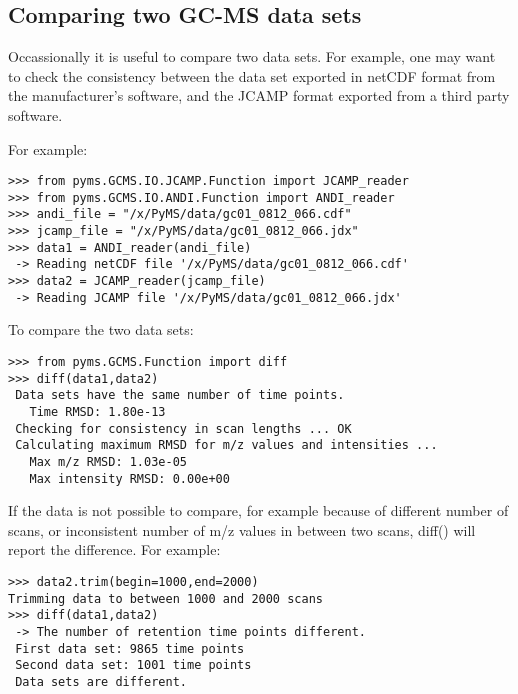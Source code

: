 \subsection{Comparing two GC-MS data sets}


Occassionally it is useful to compare two data sets. For example,
one may want to check the consistency between the data set
exported in netCDF format from the manufacturer's software, and
the JCAMP format exported from a third party software.

For example:

\begin{verbatim}
>>> from pyms.GCMS.IO.JCAMP.Function import JCAMP_reader
>>> from pyms.GCMS.IO.ANDI.Function import ANDI_reader
>>> andi_file = "/x/PyMS/data/gc01_0812_066.cdf"
>>> jcamp_file = "/x/PyMS/data/gc01_0812_066.jdx"
>>> data1 = ANDI_reader(andi_file)
 -> Reading netCDF file '/x/PyMS/data/gc01_0812_066.cdf'
>>> data2 = JCAMP_reader(jcamp_file)
 -> Reading JCAMP file '/x/PyMS/data/gc01_0812_066.jdx'
\end{verbatim}

To compare the two data sets:

\begin{verbatim}
>>> from pyms.GCMS.Function import diff
>>> diff(data1,data2)
 Data sets have the same number of time points.
   Time RMSD: 1.80e-13
 Checking for consistency in scan lengths ... OK
 Calculating maximum RMSD for m/z values and intensities ... 
   Max m/z RMSD: 1.03e-05
   Max intensity RMSD: 0.00e+00
\end{verbatim}

If the data is not possible to compare, for example because of
different number of scans, or inconsistent number of m/z values
in between two scans, diff() will report the difference.
For example:

\begin{verbatim}
>>> data2.trim(begin=1000,end=2000)
Trimming data to between 1000 and 2000 scans
>>> diff(data1,data2)
 -> The number of retention time points different.
 First data set: 9865 time points
 Second data set: 1001 time points
 Data sets are different.
\end{verbatim}

